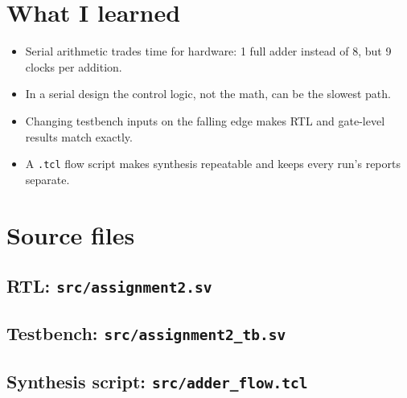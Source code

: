 \documentclass[11pt,a4paper]{article}
\begin{document}
\section{What I learned}
\begin{itemize}
\item Serial arithmetic trades time for hardware: 1 full adder instead of 8, but 9 clocks per addition.
\item In a serial design the control logic, not the math, can be the slowest path.
\item Changing testbench inputs on the falling edge makes RTL and gate-level results match exactly.
\item A \texttt{.tcl} flow script makes synthesis repeatable and keeps every run's reports separate.
\end{itemize}

\appendix
\section{Source files}
\subsection*{RTL: \texttt{src/assignment2.sv}}

\subsection*{Testbench: \texttt{src/assignment2\_tb.sv}}

\subsection*{Synthesis script: \texttt{src/adder\_flow.tcl}}

\end{document}
